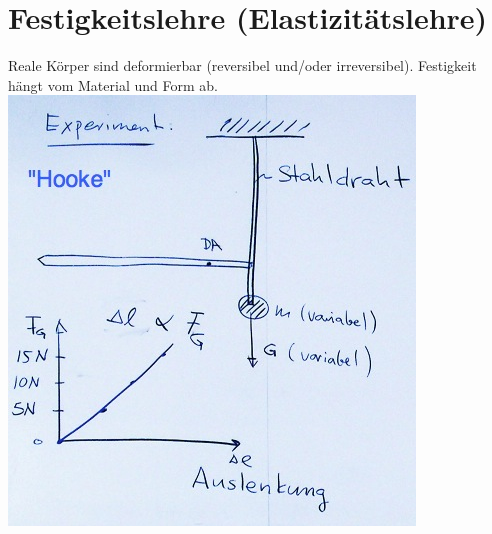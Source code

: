 \section{Festigkeitslehre (Elastizitätslehre)}
Reale Körper sind deformierbar (reversibel und/oder irreversibel). Festigkeit hängt vom Material und Form ab. \\
\includegraphics{Bild40}

